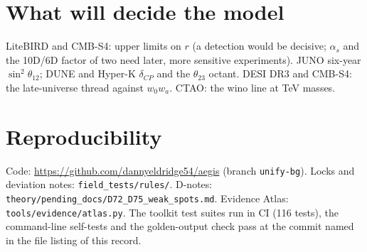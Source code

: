 \documentclass[11pt]{article}
\begin{document}
\section{What will decide the model}
LiteBIRD and CMB-S4: upper limits on $r$ (a detection would be decisive; $\alpha_s$ and the 10D/6D factor of two need later, more sensitive experiments). JUNO six-year $\sin^2\theta_{12}$; DUNE and Hyper-K $\delta_{CP}$ and the $\theta_{23}$ octant. DESI DR3 and CMB-S4: the late-universe thread against $w_0w_a$. CTAO: the wino line at TeV masses.

\section*{Reproducibility}
Code: \url{https://github.com/dannyeldridge54/aegis} (branch \texttt{unify-bg}). Locks and deviation notes: \texttt{field\_tests/rules/}. D-notes: \texttt{theory/pending\_docs/D72\_D75\_weak\_spots.md}. Evidence Atlas: \texttt{tools/evidence/atlas.py}. The toolkit test suites run in CI (116 tests), the command-line self-tests and the golden-output check pass at the commit named in the file listing of this record.
\end{document}
